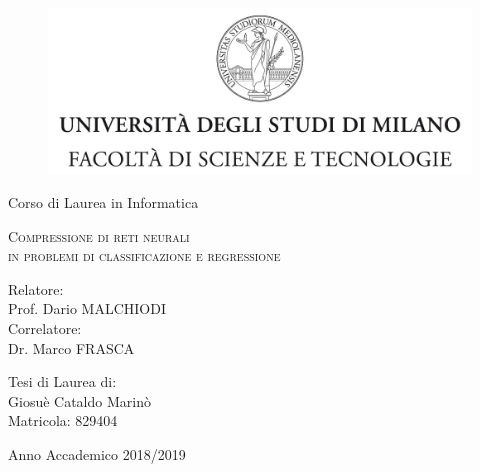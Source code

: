 \documentclass[11pt,a4paper,twoside,
openright]{book}
\begin{document}
\begin{titlepage}
	
	\begin{figure}
		\centering
		\includegraphics[width=424pt]{tesiSCIENZE_TECNOLOGIE.jpg}%
		\vspace{0.5 cm}
	\end{figure}
	

\begin{center}
{\LARGE Corso di Laurea in Informatica}
\end{center}

\begin{center}
\vspace{3 cm}
{\LARGE \textsc{Compressione di reti neurali \\[5pt] in problemi  di classificazione e regressione} }
\end{center}
\par
  \vspace{3 cm}
  
  \begin{flushleft}
  		 Relatore:\\Prof. Dario MALCHIODI\\
		 
  		 \noindent Correlatore:\\Dr. Marco FRASCA
  \end{flushleft}
  \vspace{1 cm}
  \begin{flushright}
  	Tesi di Laurea di:\\ Giosuè Cataldo Marinò\\ Matricola: 829404
  \end{flushright}
    	  
\vfill
\begin{center}
	{\large Anno Accademico 2018/2019}
\end{center}

\end{titlepage}
\end{document}
